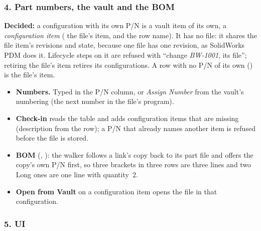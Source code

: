 \subsubsection*{4. Part numbers, the vault and the BOM}

\textbf{Decided:} a configuration with its own P/N is a vault item of its own, a \emph{configuration item}
( the file's item, and the row name). It has no file: it shares the file item's
revisions and state, because one file has one revision, as SolidWorks PDM does it. Lifecycle steps on it are
refused with ``change \emph{BW-1001}, its file''; retiring the file's item retires its configurations.
A row with no P/N of its own () is the file's item.
\begin{itemize}
  \item \textbf{Numbers.} Typed in the P/N column, or \emph{Assign Number} from the vault's numbering
        (the next number in the file's program).
  \item \textbf{Check-in} reads the table and adds configuration items that are missing (description from
        the row); a P/N that already names another item is refused before the file is stored.
  \item \textbf{BOM} (, ): the walker follows a link's copy back to its
        part file and offers the copy's own P/N first, so three brackets in three rows are three lines and two
        Long ones are one line with quantity~2.
  \item \textbf{Open from Vault} on a configuration item opens the file in that configuration.
\end{itemize}

\subsubsection*{5. UI}

